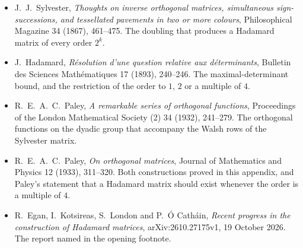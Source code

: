 \begin{itemize}
\item J.~J.~Sylvester, \emph{Thoughts on inverse orthogonal matrices, simultaneous sign-successions, and tessellated pavements in two or more colours}, Philosophical Magazine 34 (1867), 461--475. The doubling that produces a Hadamard matrix of every order $2^k$.
\item J.~Hadamard, \emph{R\'esolution d'une question relative aux d\'eterminants}, Bulletin des Sciences Math\'ematiques 17 (1893), 240--246. The maximal-determinant bound, and the restriction of the order to $1$, $2$ or a multiple of $4$.
\item R.~E.~A.~C.~Paley, \emph{A remarkable series of orthogonal functions}, Proceedings of the London Mathematical Society (2) 34 (1932), 241--279. The orthogonal functions on the dyadic group that accompany the Walsh rows of the Sylvester matrix.
\item R.~E.~A.~C.~Paley, \emph{On orthogonal matrices}, Journal of Mathematics and Physics 12 (1933), 311--320. Both constructions proved in this appendix, and Paley's statement that a Hadamard matrix should exist whenever the order is a multiple of $4$.
\item R.~Egan, I.~Kotsireas, S.~London and P.~\'O Cath\'ain, \emph{Recent progress in the construction of Hadamard matrices}, arXiv:2610.27175v1, 19 October 2026. The report named in the opening footnote.
\end{itemize}

